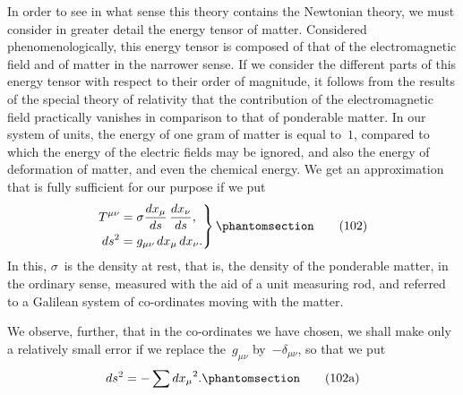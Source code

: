 \documentclass[12pt]{book}[2005/09/16]
\newcommand{\Change}[2]{#2}
\newcommand{\Add}[1]{\Change{}{#1}}
\newcommand{\PageSep}[1]{\ignorespaces}
\newcommand{\Tag}[1]{%
  \phantomsection
  \label{eqn:#1}
  \tag*{#1}
}
\begin{document}
In order to see in what sense this theory contains the
Newtonian theory, we must consider in greater detail
the energy tensor of matter. Considered phenomenologically,
this energy tensor is composed of that of the
electromagnetic field and of matter in the narrower sense.
If we consider the different parts of this energy tensor
with respect to their order of magnitude, it follows
from the results of the special theory of relativity that
the contribution of the electromagnetic field practically
vanishes in comparison to that of ponderable matter. In
our system of units, the energy of one gram of matter is
equal to~$1$, compared to which the energy of the electric
fields may be ignored, and also the energy of deformation
of matter, and even the chemical energy. We get an
approximation that is fully sufficient for our purpose if
\PageSep{97}
we put
\[
\left.
\begin{aligned}
T^{\mu\nu} &= \sigma \frac{dx_{\mu}}{ds}\, \frac{dx_{\nu}}{ds}\Add{,} \\
ds^{2} &= g_{\mu\nu}\, dx_{\mu}\, dx_{\nu}\Add{.}
\end{aligned}
\right\}
\Tag{(102)}
\]
In this, $\sigma$~is the density at rest, that is, the density of the
ponderable matter, in the ordinary sense, measured with
the aid of a unit measuring rod, and referred to a Galilean
system of co-ordinates moving with the matter.

We observe, further, that in the co-ordinates we have
chosen, we shall make only a relatively small error if we
replace the~$g_{\mu\nu}$ by~$-\delta_{\mu\nu}$, so that we put
\[
ds^{2} = -\sum {dx_{\mu}}^{2}\Add{.}
\Tag{(102a)}
\]
\end{document}
